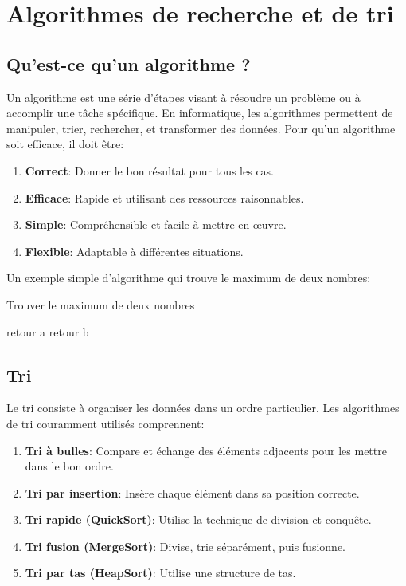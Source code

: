\chapter{Algorithmes de recherche et de tri}

\section{Qu’est-ce qu’un algorithme ?}

Un algorithme est une série d'étapes visant à résoudre un problème ou à accomplir une tâche spécifique. En informatique, les algorithmes permettent de manipuler, trier, rechercher, et transformer des données. Pour qu'un algorithme soit efficace, il doit être:

\begin{enumerate}
	\item \textbf{Correct}: Donner le bon résultat pour tous les cas.
	\item \textbf{Efficace}: Rapide et utilisant des ressources raisonnables.
	\item \textbf{Simple}: Compréhensible et facile à mettre en œuvre.
	\item \textbf{Flexible}: Adaptable à différentes situations.
\end{enumerate}

Un exemple simple d'algorithme qui trouve le maximum de deux nombres:

\begin{algorithm}
	\caption{Trouver le maximum de deux nombres}
	\begin{algorithmic}
		\State retour a
		\Else
		\State retour b
		\EndIf
	\end{algorithmic}
\end{algorithm}

\section{Tri}

Le tri consiste à organiser les données dans un ordre particulier. Les algorithmes de tri couramment utilisés comprennent:

\begin{enumerate}
	\item \textbf{Tri à bulles}: Compare et échange des éléments adjacents pour les mettre dans le bon ordre.
	\item \textbf{Tri par insertion}: Insère chaque élément dans sa position correcte.
	\item \textbf{Tri rapide (QuickSort)}: Utilise la technique de division et conquête.
	\item \textbf{Tri fusion (MergeSort)}: Divise, trie séparément, puis fusionne.
	\item \textbf{Tri par tas (HeapSort)}: Utilise une structure de tas.
\end{enumerate}

